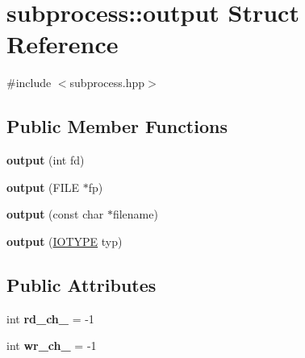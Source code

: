 \hypertarget{structsubprocess_1_1output}{}\section{subprocess\+:\+:output Struct Reference}
\label{structsubprocess_1_1output}


{\ttfamily \#include $<$subprocess.\+hpp$>$}

\subsection*{Public Member Functions}
\begin{DoxyCompactItemize}
\item 
\mbox{\label{structsubprocess_1_1output_a34c49d15b0678afeded5547519439fec}} 
{\bfseries output} (int fd)
\item 
\mbox{\label{structsubprocess_1_1output_af467ee1e3477657b7acf31197bb4b889}} 
{\bfseries output} (F\+I\+LE $\ast$fp)
\item 
\mbox{\label{structsubprocess_1_1output_ae9e3dba23eef8858b8dbfc887db67edc}} 
{\bfseries output} (const char $\ast$filename)
\item 
\mbox{\label{structsubprocess_1_1output_a1d42f67b75c7ea084c170cc32f61127a}} 
{\bfseries output} (\hyperlink{namespacesubprocess_a8c21131feb99bed9ffa644851ff499ed}{I\+O\+T\+Y\+PE} typ)
\end{DoxyCompactItemize}
\subsection*{Public Attributes}
\begin{DoxyCompactItemize}
\item 
\mbox{\label{structsubprocess_1_1output_a9d19a26f40f1a19111f7aa1991c2fbea}} 
int {\bfseries rd\+\_\+ch\+\_\+} = -\/1
\item 
\mbox{\label{structsubprocess_1_1output_acceb716c651dfc52156ff56d7b090c58}} 
int {\bfseries wr\+\_\+ch\+\_\+} = -\/1
\end{DoxyCompactItemize}


